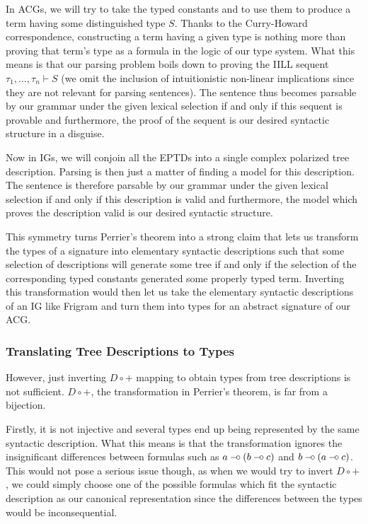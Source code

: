 In ACGs, we will try to take the typed constants and to use them to
produce a term having some distinguished type $S$. Thanks to the
Curry-Howard correspondence, constructing a term having a given type is
nothing more than proving that term's type as a formula in the logic of
our type system. What this means is that our parsing problem boils down
to proving the IILL sequent $\tau_1, ..., \tau_n \vdash S$ (we omit the
inclusion of intuitionistic non-linear implications since they are not
relevant for parsing sentences). The sentence thus becomes parsable by
our grammar under the given lexical selection if and only if this
sequent is provable and furthermore, the proof of the sequent is our
desired syntactic structure in a disguise.

Now in IGs, we will conjoin all the EPTDs into a single complex
polarized tree description. Parsing is then just a matter of finding a
model for this description. The sentence is therefore parsable by our
grammar under the given lexical selection if and only if this
description is valid and furthermore, the model which proves the
description valid is our desired syntactic structure.

This symmetry turns Perrier's theorem into a strong claim that lets us
transform the types of a signature into elementary syntactic
descriptions such that some selection of descriptions will generate some
tree if and only if the selection of the corresponding typed constants
generated some properly typed term. Inverting this transformation would
then let us take the elementary syntactic descriptions of an IG like
Frigram and turn them into types for an abstract signature of our ACG.

\subsubsection{Translating Tree Descriptions to Types}

However, just inverting $D \circ +$ mapping to obtain types from tree
descriptions is not sufficient. $D \circ +$, the transformation in
Perrier's theorem, is far from a bijection.

Firstly, it is not injective and several types end up being represented
by the same syntactic description. What this means is that the
transformation ignores the insignificant differences between formulas
such as $a \mathbin{{-}\mkern-3.5mu{\circ}} (b \mathbin{{-}\mkern-3.5mu{\circ}} c)$ and $b \mathbin{{-}\mkern-3.5mu{\circ}} (a \mathbin{{-}\mkern-3.5mu{\circ}} c)$. This would not
pose a serious issue though, as when we would try to invert $D \circ +$,
we could simply choose one of the possible formulas which fit the
syntactic description as our canonical representation since the
differences between the types would be inconsequential.

